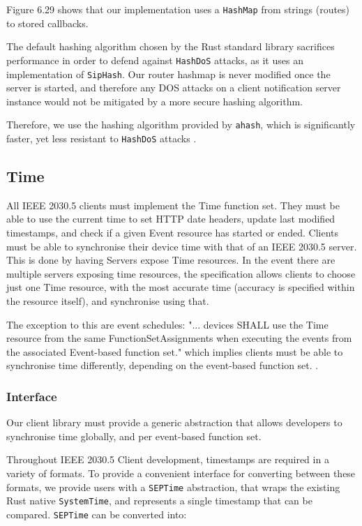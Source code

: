 Figure 6.29 shows that our implementation uses a \texttt{HashMap} from strings (routes) to stored callbacks. 

The default hashing algorithm chosen by the Rust standard library sacrifices performance in order to defend against \texttt{HashDoS} attacks, as it uses an implementation of \texttt{SipHash}. Our router hashmap is never modified once the server is started, and therefore any DOS attacks on a client notification server instance would not be mitigated by a more secure hashing algorithm.

Therefore, we use the hashing algorithm provided by \texttt{ahash}, which is significantly faster, yet less resistant to \texttt{HashDoS} attacks \cite{ahash} \cite{hashbrown}.

\subsection{Time}
All IEEE 2030.5 clients must implement the Time function set. They must be able to use the current time to set HTTP date headers, update last modified timestamps, and check if a given Event resource has started or ended. Clients must be able to synchronise their device time with that of an IEEE 2030.5 server. This is done by having Servers expose Time resources. In the event there are multiple servers exposing time resources, the specification allows clients to choose just one Time resource, with the most accurate time (accuracy is specified within the resource itself), and synchronise using that.

The exception to this are event schedules: "... devices SHALL use the Time resource from the same FunctionSetAssignments when executing the events from the associated Event-based function set." which implies clients must be able to synchronise time differently, depending on the event-based function set. \cite{IEEE2030.5}.

\subsubsection{Interface}
Our client library must provide a generic abstraction that allows developers to synchronise time globally, and per event-based function set.

Throughout IEEE 2030.5 Client development, timestamps are required in a variety of formats. To provide a convenient interface for converting between these formats, we provide users with a \texttt{SEPTime} abstraction, that wraps the existing Rust native \texttt{SystemTime}, and represents a single timestamp that can be compared. \texttt{SEPTime} can be converted into:

